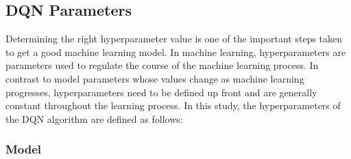 \documentclass[conference]{IEEEtran}
\begin{document}
\subsection{DQN Parameters}
\label{sec:parameter_dqn}
Determining the right hyperparameter value is one of the important steps taken to get a good machine learning model. In machine learning, hyperparameters are parameters used to regulate the course of the machine learning process. In contrast to model parameters whose values change as machine learning progresses, hyperparameters need to be defined up front and are generally constant throughout the learning process. In this study, the hyperparameters of the DQN algorithm are defined as follows:

\subsubsection{Model}
\label{sec:model}
\begin{table}[H]
	\caption{Hyperparameter model.}
	\label{tb:hyperparameter_model}
\end{table}
\end{document}
